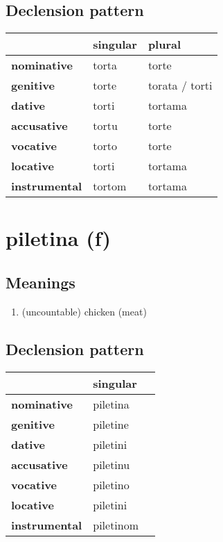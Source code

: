 \subsection*{Declension pattern}
\begin{tabularx}{\linewidth}{Xll}
\toprule
{} & singular &          plural \\
\midrule
\textbf{nominative  } &    torta &           torte \\
\textbf{genitive    } &    torte &  torata / torti \\
\textbf{dative      } &    torti &         tortama \\
\textbf{accusative  } &    tortu &           torte \\
\textbf{vocative    } &    torto &           torte \\
\textbf{locative    } &    torti &         tortama \\
\textbf{instrumental} &   tortom &         tortama \\
\bottomrule
\end{tabularx}

\filbreak
\section{piletina (f)}
\subsection*{Meanings}
\begin{enumerate}
\item (uncountable) chicken (meat)
\end{enumerate}
\subsection*{Declension pattern}
\begin{tabularx}{\linewidth}{Xll}
\toprule
{} &   singular \\
\midrule
\textbf{nominative  } &   piletina \\
\textbf{genitive    } &   piletine \\
\textbf{dative      } &   piletini \\
\textbf{accusative  } &   piletinu \\
\textbf{vocative    } &   piletino \\
\textbf{locative    } &   piletini \\
\textbf{instrumental} &  piletinom \\
\bottomrule
\end{tabularx}

